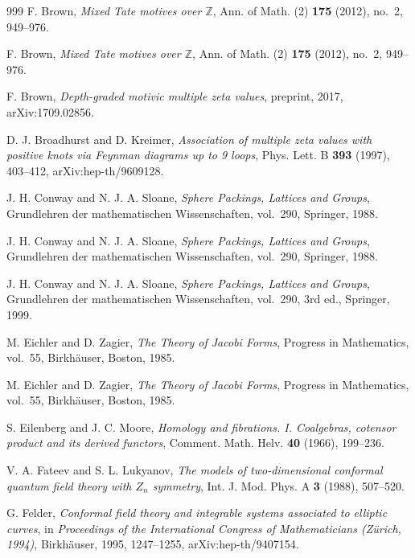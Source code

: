 \begin{thebibliography}{999}
F. Brown, \emph{Mixed Tate motives over $\mathbb{Z}$}, Ann. of Math. (2) \textbf{175} (2012), no.~2, 949--976.

F. Brown, \emph{Mixed Tate motives over $\mathbb{Z}$}, Ann. of Math. (2) \textbf{175} (2012), no.~2, 949--976.

F. Brown, \emph{Depth-graded motivic multiple zeta values}, preprint, 2017, arXiv:1709.02856.

D. J. Broadhurst and D. Kreimer, \emph{Association of multiple zeta values with positive knots via Feynman diagrams up to 9 loops}, Phys. Lett. B \textbf{393} (1997), 403--412, arXiv:hep-th/9609128.

J. H. Conway and N. J. A. Sloane, \emph{Sphere Packings, Lattices and Groups}, Grundlehren der mathematischen Wissenschaften, vol.~290, Springer, 1988.

J. H. Conway and N. J. A. Sloane, \emph{Sphere Packings, Lattices and Groups}, Grundlehren der mathematischen Wissenschaften, vol.~290, Springer, 1988.

J. H. Conway and N. J. A. Sloane, \emph{Sphere Packings, Lattices and Groups}, Grundlehren der mathematischen Wissenschaften, vol.~290, 3rd ed., Springer, 1999.

M. Eichler and D. Zagier, \emph{The Theory of Jacobi Forms}, Progress in Mathematics, vol.~55, Birkh\"auser, Boston, 1985.

M. Eichler and D. Zagier, \emph{The Theory of Jacobi Forms}, Progress in Mathematics, vol.~55, Birkh\"auser, Boston, 1985.

S. Eilenberg and J. C. Moore, \emph{Homology and fibrations. I. Coalgebras, cotensor product and its derived functors}, Comment. Math. Helv. \textbf{40} (1966), 199--236.

V. A. Fateev and S. L. Lukyanov, \emph{The models of two-dimensional conformal quantum field theory with $Z_n$ symmetry}, Int. J. Mod. Phys. A \textbf{3} (1988), 507--520.

G. Felder, \emph{Conformal field theory and integrable systems associated to elliptic curves}, in \emph{Proceedings of the International Congress of Mathematicians (Z\"urich, 1994)}, Birkh\"auser, 1995, 1247--1255, arXiv:hep-th/9407154.


\end{thebibliography}
